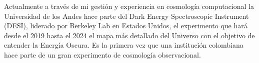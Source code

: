 \documentclass{book}
\begin{document}
Actualmente a trav\'es de mi
gesti\'on y experiencia en cosmolog\'ia computacional la Universidad
de los Andes hace parte del Dark Energy Spectroscopic Instrument
(DESI), liderado por Berkeley Lab en Estados Unidos, el experimento
que har\'a desde el 2019 hasta el 2024 el mapa m\'as detallado del
Universo con el objetivo de entender la Energ\'ia Oscura. 
Es la primera vez que una instituci\'on colombiana hace parte de un
gran experimento de cosmolog\'ia observacional. 
\end{document}
